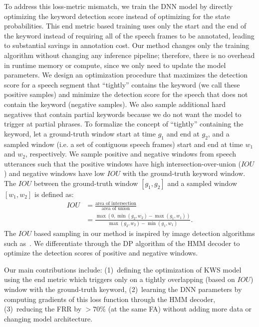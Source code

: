 \documentclass{article}
\begin{document}
To address this loss-metric mismatch, we train the DNN model by directly optimizing the keyword detection score instead of optimizing for the state probabilities.
This end metric based training uses only the start and the end of the keyword instead of requiring all of the speech frames to be annotated, leading to substantial savings in annotation cost.
Our method changes only the training algorithm without changing any inference pipeline; therefore, there is no overhead in runtime memory or compute, since we only need to update the model parameters.
We design an optimization procedure that maximizes the detection score for a speech segment that “tightly” contains the keyword (we call these positive samples) and minimize the detection score for the speech that does not contain the keyword (negative samples).
We also sample additional hard negatives that contain partial keywords because we do not want the model to trigger at partial phrases. To formalize the concept of “tightly” containing the keyword, let a ground-truth window start at time $g_1$ and end at $g_2$, and a sampled window (i.e. a set of contiguous speech frames) start and end at time $w_1$ and $w_2$, respectively.
We sample positive and negative windows from speech utterances such that the positive windows have high intersection-over-union ($IOU$) and negative windows have low $IOU$ with the ground-truth keyword window.
The $IOU$ between the ground-truth window $[g_1, g_2]$ and a sampled window $[w_1, w_2]$  is defined as:
\begin{align}
IOU &= \frac{\text{area of intersection}}{\text{area of union}} \nonumber \\
&= \frac{\max(0, \min(g_2, w_2) - \max(g_1, w_1))}{\max(g_2, w_2) - \min(g_1, w_1)}.
\end{align}
The $IOU$ based sampling in our method is inspired by image detection algorithms such as~\cite{yoloRedmon2016, yolo3Redmon2017, FasterRcnn2015}.
We differentiate through the DP algorithm of the  HMM decoder to optimize the detection scores of positive and negative windows.

Our main contributions include: (1)~defining the optimization of KWS model using the end metric which triggers only on a tightly overlapping (based on $IOU$) window with the ground-truth keyword,
(2)~learning the DNN parameters by computing gradients of this loss function through the HMM decoder, (3)~reducing the FRR by $>70\%$ (at the same FA) without adding more data or changing model architecture.
\end{document}
